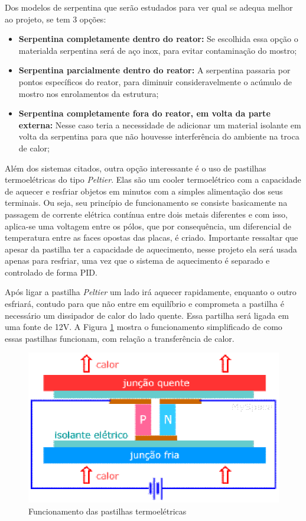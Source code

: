 Dos modelos de serpentina que serão estudados para ver qual se adequa melhor ao projeto, se tem 3 opções:

\begin{itemize}
  \item \textbf{Serpentina completamente dentro do reator:} Se escolhida essa opção o materialda serpentina será de aço inox, para evitar contaminação do mostro;
  \item \textbf{Serpentina parcialmente dentro do reator:} A serpentina passaria por pontos específicos do reator, para diminuir consideravelmente o acúmulo de mostro nos enrolamentos da estrutura;
  \item \textbf{Serpentina completamente fora do reator, em volta da parte externa:} Nesse caso teria a necessidade de adicionar um material isolante em volta da serpentina para que não houvesse interferência do ambiente na troca de calor;
\end{itemize}

Além dos sistemas citados, outra opção interessante é o uso de pastilhas termoelétricas do tipo \textit{Peltier}. Elas são um cooler termoelétrico com a capacidade de aquecer e resfriar objetos em minutos com a simples alimentação dos seus terminais. Ou seja, seu princípio de funcionamento se consiste basicamente na passagem de corrente elétrica contínua entre dois metais diferentes e com isso, aplica-se uma voltagem entre os pólos, que por consequência, um diferencial de temperatura entre as faces opostas das placas, é criado. Importante ressaltar que apesar da pastilha ter a capacidade de aquecimento, nesse projeto ela será usada apenas para resfriar, uma vez que o sistema de aquecimento é separado e controlado de forma PID.

Após ligar a pastilha \textit{Peltier} um lado irá aquecer rapidamente, enquanto o outro esfriará, contudo para que não entre em equilíbrio e comprometa a pastilha é necessário um dissipador de calor do lado quente. Essa partilha será ligada em uma fonte de 12V. A Figura \ref{pastilhas} mostra o funcionamento simplificado de como essas pastilhas funcionam, com relação a transferência de calor.

\begin{figure}[h]
	\centering
	\includegraphics[keepaspectratio=true,scale=0.6]{figuras/pastilhas.eps}
	\caption{Funcionamento das pastilhas termoelétricas}
	\label{pastilhas}
\end{figure}


